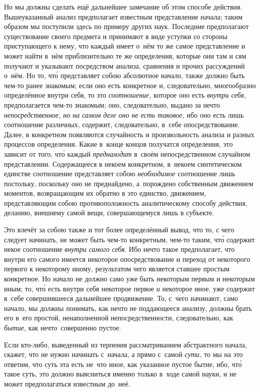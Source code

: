 Но мы должны сделать ещё дальнейшее замечание об этом способе действия.
Вышеуказанный анализ предполагает известным представление начала; таким образом
мы поступили здесь по примеру других наук. Последние предполагают существование
своего предмета и принимают в виде уступки со стороны приступающего к нему, что
каждый имеет о~нём то же самое представление и может найти в~нём приблизительно
те же определения, которые они там и сям получают и указывают посредством
анализа, сравнения и прочих рассуждений о~нём. Но то, чт\'{о} представляет
собою абсолютное начало, также должно быть чем-то ранее знакомым; если оно есть
конкретное и, следовательно, многообразно определённое внутри себя, то это
{\em соотношение,} которое оно есть {\em внутри себя,} предполагается чем-то
знакомым; оно, следовательно, выдано за нечто {\em непосредственное, но на
самом деле оно не есть таковое,} ибо оно есть лишь соотношение различных,
содержит, следовательно, в~себе опосредствование. Далее, в конкретном
появляются случайность и произвольность анализа и разных процессов определения.
Какие в~конце концов получатся определения, это зависит от того, чт\'{о} каждый
{\em преднаходит} в~своём непосредственном случайном представлении.
Содержащееся в некоем конкретном, в~некоем синтетическом единстве соотношение
представляет собою {\em необходимое} соотношение лишь постольку, поскольку оно
не преднайдено, а~порождено собственным движением моментов, возвращающим их
обратно в это единство, движением, представляющим собою противоположность
аналитическому способу действия, деланию, внешнему самой вещи, совершающемуся
лишь в субъекте.

Это влечёт за собою также и тот более определённый вывод, что то, с чего
следует начинать, не может быть чем-то конкретным, чем-то таким, чт\'{о}
содержит некое соотношение {\em внутри самого себя}. Ибо нечто такое
предполагает, что внутри его самого имеется некоторое опосредствование и
переход от некоторого первого к некоторому иному, результатом чего является
ставшее простым конкретное. Но начало не должно само уже быть некоторым первым
и некоторым иным; то, чт\'{о} есть внутри себя некоторое первое {\em и}
некоторое иное, уже содержит в~себе совершившееся дальнейшее продвижение. То,
с~чего начинают, само начало, мы должны понимать, как нечто не поддающееся
анализу, должны брать его в~его простой, ненаполненной непосредственности,
следовательно, как {\em бытие,} как нечто~совершенно пустое.

Если кто-либо, выведенный из терпения рассматриванием абстрактного начала,
скажет, что не нужно начинать с~начала, а прямо с~самой {\em сути,} то мы на
это ответим, что суть эта есть не~что иное, как указанное пустое бытие, ибо,
чт\'{о} такое суть, это должно выясниться именно только в~ходе самой науки,
и не может предполагаться известным до~неё.

